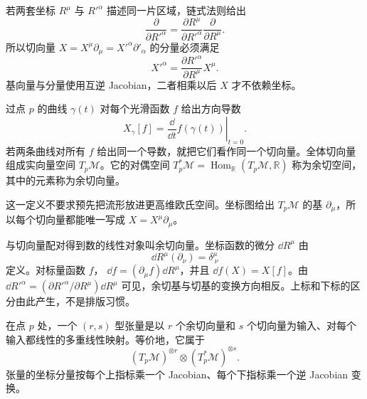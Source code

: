 若两套坐标 \(R^\mu\) 与 \(R'^{\alpha}\) 描述同一片区域，链式法则给出
\begin{equation}
\frac{\partial}{\partial R'^\alpha}
=\frac{\partial R^\mu}{\partial R'^\alpha}
\frac{\partial}{\partial R^\mu}.
\label{eq:bh-tangent-basis-transform}
\end{equation}
所以切向量
\(X=X^\mu\partial_\mu=X'^\alpha\partial'_\alpha\)
的分量必须满足
\begin{equation}
X'^\alpha
=\frac{\partial R'^\alpha}{\partial R^\mu}X^\mu.
\label{eq:bh-vector-component-transform}
\end{equation}
基向量与分量使用互逆 Jacobian，二者相乘以后 \(X\) 才不依赖坐标。

\begin{definition}[切向量与余切向量]
过点 \(p\) 的曲线
\(\gamma(t)\) 对每个光滑函数 \(f\) 给出方向导数
\[
X_\gamma[f]
=\left.\frac{\dd}{\dd t}f(\gamma(t))\right|_{t=0}.
\]
若两条曲线对所有 \(f\) 给出同一个导数，就把它们看作同一个切向量。全体切向量组成实向量空间 \(T_p\mathcal M\)。它的对偶空间 \(T_p^*\mathcal M=\operatorname{Hom}_{\mathbb R}(T_p\mathcal M,\mathbb R)\) 称为余切空间，其中的元素称为余切向量。
\end{definition}

这一定义不要求预先把流形放进更高维欧氏空间。坐标图给出 \(T_p\mathcal M\) 的基 \(\partial_\mu\)，所以每个切向量都能唯一写成 \(X=X^\mu\partial_\mu\)。

与切向量配对得到数的线性对象叫余切向量。坐标函数的微分
\(\dd R^\mu\) 由
\begin{equation}
\dd R^\mu(\partial_\nu)=\delta^\mu_{\ \nu}
\label{eq:bh-dual-basis}
\end{equation}
定义。对标量函数 \(f\)，
\(
\dd f=(\partial_\mu f)\dd R^\mu
\)，并且
\(\dd f(X)=X[f]\)。由
\(\dd R'^\alpha=(\partial R'^\alpha/\partial R^\mu)\dd R^\mu\)
可见，余切基与切基的变换方向相反。上标和下标的区分由此产生，不是排版习惯。

\begin{definition}[张量]
在点 \(p\) 处，一个 \((r,s)\) 型张量是以 \(r\) 个余切向量和
\(s\) 个切向量为输入、对每个输入都线性的多重线性映射。等价地，它属于
\[
(T_p\mathcal M)^{\otimes r}\otimes
(T_p^*\mathcal M)^{\otimes s}.
\]
张量的坐标分量按每个上指标乘一个 Jacobian、每个下指标乘一个逆 Jacobian 变换。
\end{definition}

